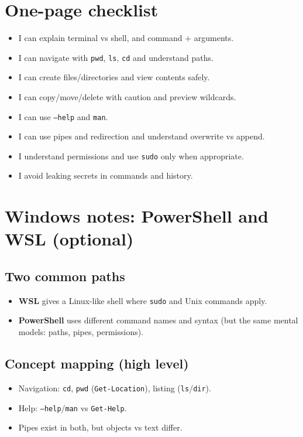 \section{One-page checklist}
\begin{itemize}
\item I can explain terminal vs shell, and command + arguments.
\item I can navigate with \texttt{pwd}, \texttt{ls}, \texttt{cd} and understand paths.
\item I can create files/directories and view contents safely.
\item I can copy/move/delete with caution and preview wildcards.
\item I can use \texttt{--help} and \texttt{man}.
\item I can use pipes and redirection and understand overwrite vs append.
\item I understand permissions and use \texttt{sudo} only when appropriate.
\item I avoid leaking secrets in commands and history.
\end{itemize}

\section{Windows notes: PowerShell and WSL (optional)}
\subsection{Two common paths}
\begin{itemize}
\item \textbf{WSL} gives a Linux-like shell where \texttt{sudo} and Unix commands apply.
\item \textbf{PowerShell} uses different command names and syntax (but the same mental models: paths, pipes, permissions).
\end{itemize}

\subsection{Concept mapping (high level)}
\begin{itemize}
\item Navigation: \texttt{cd}, \texttt{pwd} (\texttt{Get-Location}), listing (\texttt{ls}/\texttt{dir}).
\item Help: \texttt{--help}/\texttt{man} vs \texttt{Get-Help}.
\item Pipes exist in both, but objects vs text differ.
\end{itemize}


